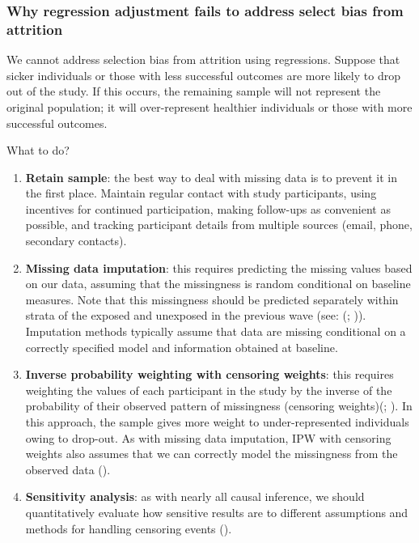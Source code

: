 \documentclass[
  singlecolumn,
  9pt]{article}
\begin{document}
\subsubsection{Why regression adjustment fails to address select bias
from
attrition}\label{why-regression-adjustment-fails-to-address-select-bias-from-attrition}

We cannot address selection bias from attrition using regressions.
Suppose that sicker individuals or those with less successful outcomes
are more likely to drop out of the study. If this occurs, the remaining
sample will not represent the original population; it will
over-represent healthier individuals or those with more successful
outcomes.

What to do?

\begin{enumerate}
\def\labelenumi{\arabic{enumi}.}
\item
  \textbf{Retain sample}: the best way to deal with missing data is to
  prevent it in the first place. Maintain regular contact with study
  participants, using incentives for continued participation, making
  follow-ups as convenient as possible, and tracking participant details
  from multiple sources (email, phone, secondary contacts).
\item
  \textbf{Missing data imputation}: this requires predicting the missing
  values based on our data, assuming that the missingness is random
  conditional on baseline measures. Note that this missingness should be
  predicted separately within strata of the exposed and unexposed in the
  previous wave (see: (; )).
  Imputation methods typically assume that data are missing conditional
  on a correctly specified model and information obtained at baseline.
\item
  \textbf{Inverse probability weighting with censoring weights}: this
  requires weighting the values of each participant in the study by the
  inverse of the probability of their observed pattern of missingness
  (censoring weights)(;
  ). In this
  approach, the sample gives more weight to under-represented
  individuals owing to drop-out. As with missing data imputation, IPW
  with censoring weights also assumes that we can correctly model the
  missingness from the observed data ().
\item
  \textbf{Sensitivity analysis}: as with nearly all causal inference, we
  should quantitatively evaluate how sensitive results are to different
  assumptions and methods for handling censoring events
  ().
\end{enumerate}
\end{document}

